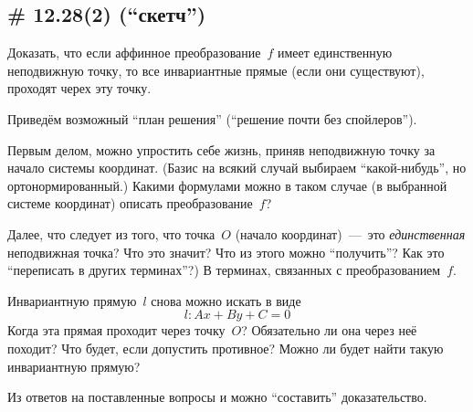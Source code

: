 \documentclass[a4paper,12pt]{article}
\begin{document}
\begin{solution}
    
  \end{solution}
  
  
  \subsection{\# 12.28(2) (``скетч'')}
  
  Доказать, что если аффинное преобразование~$f$ имеет единственную неподвижную точку, то все инвариантные прямые (если они существуют), проходят черех эту точку.
  
  \begin{solution}
    Приведём возможный ``план решения'' (``решение почти без спойлеров'').
    
    Первым делом, можно упростить себе жизнь, приняв неподвижную точку за начало системы координат.
    (Базис на всякий случай выбираем ``какой-нибудь'', но ортонормированный.)
    Какими формулами можно в таком случае (в выбранной системе координат) описать преобразование~$f$?
    
    Далее, что следует из того, что точка~$O$ (начало координат)~---~это \emph{единственная} неподвижная точка?
    Что это значит?
    Что из этого можно ``получить''?
    Как это ``переписать в других терминах''?)
    В терминах, связанных с преобразованием~$f$.
    
    Инвариантную прямую~$l$ снова можно искать в виде
    \[
      l\colon Ax + By + C = 0
    \]
    Когда эта прямая проходит через точку~$O$?
    Обязательно ли она через неё походит?
    Что будет, если допустить противное?
    Можно ли будет найти такую инвариантную прямую?
    
    Из ответов на поставленные вопросы и можно ``составить'' доказательство.
  \end{solution}
  
\end{document}
